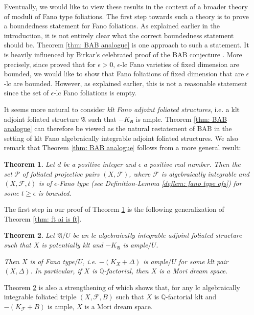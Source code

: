 \documentclass[12pt]{amsart}
\numberwithin{equation}{section}
\newcommand{\Aa}{{\mathfrak{A}}}
\newcommand{\Ff}{\mathcal{F}}
\newtheorem{thmsub}{Theorem}[subsection]
\theoremstyle{definition}
\theoremstyle{definition}
\theoremstyle{definition}
\begin{document}
Eventually, we would like to view these results in the context of a broader theory of moduli of Fano type foliations. The first step towards such a theory is to prove a boundedness statement for Fano foliations. As explained earlier in the introduction, it is not entirely clear what the correct boundedness statement should be. Theorem \ref{thm: BAB analogue} is one approach to such a statement. It is heavily influenced by Birkar's celebrated proof of the BAB conjecture \cite{Bir19,Bir21}. More precisely, since \cite{Bir19,Bir21} proved that for $\epsilon>0$,  $\epsilon$-lc Fano varieties of fixed dimension are bounded, we would like to show that Fano foliations of fixed dimension that are $\epsilon$-lc are bounded. However, as explained earlier, this is not a reasonable statement since the set of $\epsilon$-lc Fano foliations is empty.

It seems more natural to consider \emph{klt Fano adjoint foliated structures}, i.e. a klt adjoint foliated structure $\Aa$ such that $-K_{\Aa}$ is ample. Theorem \ref{thm: BAB analogue} can therefore be viewed as the natural restatement of BAB in the setting of klt Fano algebraically integrable adjoint foliated structures. We also remark that Theorem \ref{thm: BAB analogue} follows from a more general result:

\begin{thmsub}\label{thm: log foliated BAB}
Let $d$ be a positive integer and $\epsilon$ a positive real number. Then 
the set $\mathcal P$ of foliated projective pairs $(X,\mathcal F)$, where $\mathcal F$ is algebraically integrable and  
    $(X,\Ff,t)$ is of $\epsilon$-Fano type (see Definition-Lemma \ref{deflem: fano type afs}) for some $t\geq\epsilon$
is bounded. 
\end{thmsub}

The first step in our proof of Theorem \ref{thm: log foliated BAB}
is the following generalization of Theorem \ref{thm: ft ai is ft}.

\begin{thmsub}\label{thm: ft ai afs mds}
   Let $\Aa/U$ be an lc algebraically integrable adjoint foliated structure such that $X$ is potentially klt and $-K_{\Aa}$ is ample$/U$.
   
   Then $X$ is of Fano type$/U$, i.e. $-(K_X+\Delta)$ is ample$/U$ for some klt pair $(X,\Delta)$. In particular, if $X$ is $\mathbb Q$-factorial, then $X$ is a Mori dream space.
\end{thmsub}

Theorem  \ref{thm: ft ai afs mds} is also a strengthening of \cite[Theorem 1.9]{LMX24} which shows that, for any lc algebraically integrable foliated triple $(X,\Ff,B)$ such that $X$ is $\mathbb Q$-factorial klt and $-(K_{\Ff}+B)$ is ample, $X$ is a Mori dream space.
 
\end{document}
